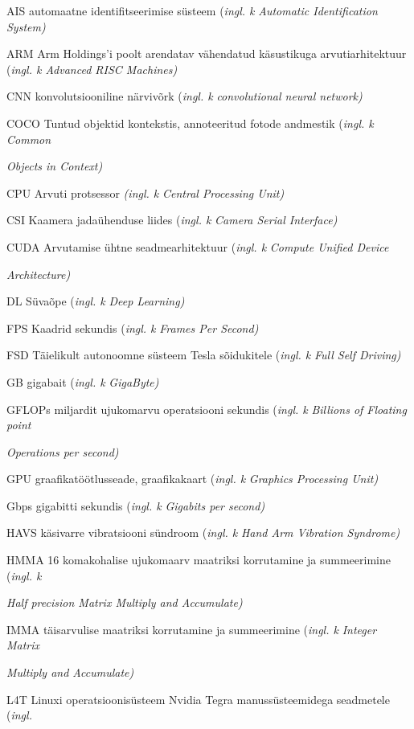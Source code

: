 
AIS automaatne identifitseerimise süsteem (\emph{ingl. k} \emph{Automatic Identification System)}

ARM Arm Holdings'i poolt arendatav vähendatud käsustikuga arvutiarhitektuur (\emph{ingl. k Advanced RISC Machines)}

CNN konvolutsiooniline närvivõrk (\emph{ingl. k} \emph{convolutional neural network)}

COCO Tuntud objektid kontekstis, annoteeritud fotode andmestik (\emph{ingl. k} \emph{Common}

\emph{Objects in Context)}

CPU Arvuti protsessor \emph{(ingl. k} \emph{Central Processing Unit)}

CSI Kaamera jadaühenduse liides (\emph{ingl. k} \emph{Camera Serial Interface)}

CUDA Arvutamise ühtne seadmearhitektuur (\emph{ingl. k} \emph{Compute Unified Device}

\emph{Architecture)}

DL Süvaõpe (\emph{ingl. k} \emph{Deep Learning)}

FPS Kaadrid sekundis (\emph{ingl. k} \emph{Frames Per Second)}

FSD Täielikult autonoomne süsteem Tesla sõidukitele (\emph{ingl. k} \emph{Full Self Driving)}

GB gigabait (\emph{ingl. k} \emph{GigaByte)}

GFLOPs miljardit ujukomarvu operatsiooni sekundis (\emph{ingl. k} \emph{Billions of Floating point}

\emph{Operations per second)}

GPU graafikatöötlusseade, graafikakaart (\emph{ingl. k} \emph{Graphics Processing Unit)}

Gbps gigabitti sekundis (\emph{ingl. k} \emph{Gigabits per second)}

HAVS käsivarre vibratsiooni sündroom (\emph{ingl. k} \emph{Hand Arm Vibration Syndrome)}

HMMA 16 komakohalise ujukomaarv maatriksi korrutamine ja summeerimine (\emph{ingl. k}

\emph{Half precision Matrix Multiply and Accumulate)}

IMMA täisarvulise maatriksi korrutamine ja summeerimine (\emph{ingl. k} \emph{Integer Matrix}

\emph{Multiply and Accumulate)}

L4T Linuxi operatsioonisüsteem Nvidia Tegra manussüsteemidega seadmetele (\emph{ingl.}

